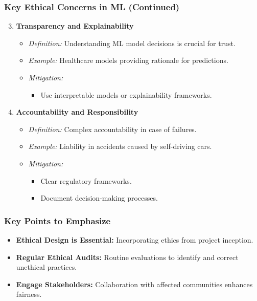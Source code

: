 \documentclass[aspectratio=169]{beamer}
\begin{document}
\begin{frame}[fragile]
    \frametitle{Key Ethical Concerns in ML (Continued)}
    \begin{enumerate}
        \setcounter{enumi}{2}
        \item \textbf{Transparency and Explainability}
            \begin{itemize}
                \item \textit{Definition:} Understanding ML model decisions is crucial for trust.
                \item \textit{Example:} Healthcare models providing rationale for predictions.
                \item \textit{Mitigation:}
                    \begin{itemize}
                        \item Use interpretable models or explainability frameworks.
                    \end{itemize}
            \end{itemize}

        \item \textbf{Accountability and Responsibility}
            \begin{itemize}
                \item \textit{Definition:} Complex accountability in case of failures.
                \item \textit{Example:} Liability in accidents caused by self-driving cars.
                \item \textit{Mitigation:}
                    \begin{itemize}
                        \item Clear regulatory frameworks.
                        \item Document decision-making processes.
                    \end{itemize}
            \end{itemize}
    \end{enumerate}
\end{frame}

\begin{frame}[fragile]
    \frametitle{Key Points to Emphasize}
    \begin{itemize}
        \item \textbf{Ethical Design is Essential:} Incorporating ethics from project inception.
        \item \textbf{Regular Ethical Audits:} Routine evaluations to identify and correct unethical practices.
        \item \textbf{Engage Stakeholders:} Collaboration with affected communities enhances fairness.
    \end{itemize}
\end{frame}
\end{document}
